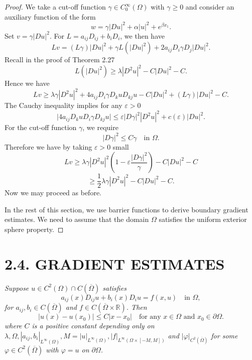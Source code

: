 \begin{proof}
\sketch
We take a cut-off function \(\gamma \in C_0^\infty(\Omega)\) with \(\gamma \geq 0\) and consider an auxiliary function of the form
\[
w = \gamma |Du|^2 + \alpha |u|^2 + e^{\beta x_1}.
\]
Set \(v = \gamma |Du|^2\). For \(L = a_{ij}D_{ij} + b_iD_i\), we then have
\[
Lv = (L\gamma)|Du|^2 + \gamma L(|Du|^2) + 2a_{ij}D_i\gamma D_j|Du|^2.
\]
Recall in the proof of Theorem 2.27
\[
L(|Du|^2) \geq \lambda |D^2u|^2 - C|Du|^2 - C.
\]
Hence we have
\[
Lv \geq \lambda\gamma|D^2u|^2 + 4a_{ij}D_i\gamma D_k u D_{kj}u - C|Du|^2 + (L\gamma)|Du|^2 - C.
\]
The Cauchy inequality implies for any \(\varepsilon > 0\)
\[
\lvert 4a_{ij}D_k u D_i\gamma D_{kj}u\rvert \leq \varepsilon |D\gamma|^2|D^2u|^2 + c(\varepsilon)|Du|^2.
\]
For the cut-off function \(\gamma\), we require
\[
|D\gamma|^2 \leq C\gamma \quad \text{in } \Omega.
\]
Therefore we have by taking \(\varepsilon > 0\) small
\[
Lv \geq \lambda\gamma|D^2u|^2 \left(1-\varepsilon \frac{|D\gamma|^2}{\gamma}\right) - C|Du|^2 - C
\]
\[
\geq \frac{1}{2}\lambda\gamma|D^2u|^2 - C|Du|^2 - C.
\]
Now we may proceed as before.

In the rest of this section, we use barrier functions to derive boundary gradient estimates. We need to assume that the domain \(\Omega\) satisfies the uniform exterior sphere property.
\end{proof}

\section*{2.4. GRADIENT ESTIMATES}

\begin{proposition}\label{hanlin:maxprin-prop-2-29}
\textit{Suppose $u \in C^2(\Omega) \cap C(\overline{\Omega})$ satisfies}
\[
a_{ij}(x)D_{ij}u + b_i(x)D_i u = f(x,u) \quad \text{in } \Omega,
\]
\textit{for $a_{ij}, b_i \in C(\overline{\Omega})$ and $f \in C(\overline{\Omega}\times \mathbb{R})$. Then}
\[
|u(x)-u(x_0)| \leq C|x-x_0| \quad \text{for any $x \in \Omega$ and $x_0 \in \partial\Omega$.}
\]
\textit{where $C$ is a positive constant depending only on $\lambda,\Omega, |a_{ij},b_i|_{L^\infty(\Omega)}, M = |u|_{L^\infty(\Omega)}, |f|_{L^\infty(\Omega\times[-M,M])}$ and $|\varphi|_{C^2(\overline{\Omega})}$ for some $\varphi \in C^2(\overline{\Omega})$ with $\varphi = u$ on $\partial\Omega$.}
\end{proposition}

